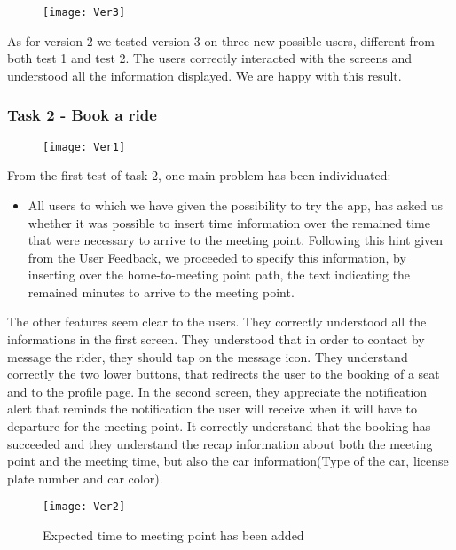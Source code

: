 \documentclass{article}
\begin{document}
\begin{figure}
    \centering
     \texttt{[image: Ver3]}
\end{figure}

As for version 2 we tested version 3 on three new possible users, different from both test 1 and test 2. The users correctly interacted with the screens and understood all the information displayed. We are happy with this result.

\subsubsection{Task 2 - Book a ride}
\graphicspath{{Doc images/Paper prototyping/Task 2}}

\begin{figure}
    \centering
     \texttt{[image: Ver1]}
\end{figure}

From the first test of task 2, one main problem has been individuated:
\begin{itemize}
    \item All users to which we have given the possibility to try the app, has asked us whether it was possible to insert time information over the remained time that were necessary to arrive to the meeting point. Following this hint given from the User Feedback, we proceeded to specify this information, by inserting over the home-to-meeting point path, the text indicating the remained minutes to arrive to the meeting point.
\end{itemize}

The other features seem clear to the users. They correctly understood all the informations in the first screen. They understood that in order to contact by message the rider, they should tap on the message icon. They understand correctly the two lower buttons, that redirects the user to the booking of a seat and to the profile page. In the second screen, they appreciate the notification alert that reminds the notification the user will receive when it will have to departure for the meeting point. It correctly understand that the booking has succeeded and they understand the recap information about both the meeting point and the meeting time, but also the car information(Type of the car, license plate number and car color).

\begin{figure}[htbp]
    \centering
    \texttt{[image: Ver2]}
    \caption{Expected time to meeting point has been added}
\end{figure}
\newpage
\end{document}

